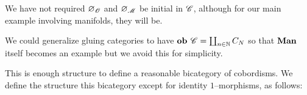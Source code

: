 \documentclass[./Thick_TQFTs_and_Quantum_Information.tex]{subfiles}
\begin{document}
\begin{rmk}
We have not required $\varnothing_{\mathscr{O}}$ and $\varnothing_{\mathscr{M}}$ be initial
in $\mathscr{C}$, although for our main example involving manifolds, they will be.
\end{rmk}


\begin{rmk}
We could generalize gluing categories to have
$\textbf{ob } \mathscr{C} = \coprod_{n \in \mathbb{N}} C_N$ so that $\textbf{Man}$ itself becomes an example
but we avoid this for simplicity.
\end{rmk}

This is enough structure to define a reasonable bicategory of cobordisms. We
define the structure this bicategory except for identity $1$--morphisms, as
follows:
\end{document}
